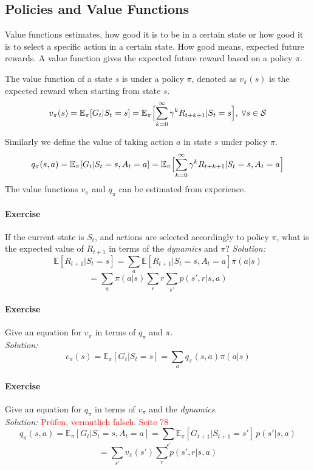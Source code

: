 \documentclass[10pt,a4paper]{article}
\begin{document}
\subsection{Policies and Value Functions}
Value functions estimates, how good it is to be in a certain state or how good it is to select a specific action in a certain state.
How good means, expected future rewards. A value function gives the expected future reward based on a policy $\pi$.

The value function of a state $s$ is under a policy $\pi$, denoted as $v_{\pi}(s)$ is the expected reward when starting from state $s$.
\[ v_{\pi}(s) = \mathbb{E}_{\pi}[G_t | S_t = s] = \mathbb{E}_{\pi} \Bigl [\sum_{k=0}^{\infty} \gamma^k R_{t+k+1} | S_t = s \Bigr ], \; \forall s \in \mathcal{S}\]

Similarly we define the value of taking action $a$ in state $s$ under policy $\pi$.
\[ q_{\pi}(s,a) = \mathbb{E}_{\pi}[ G_t | S_t=s, A_t=a] = \mathbb{E}_{\pi} \Bigl[\sum_{k=0}^{\infty} \gamma^k R_{t+k+1} | S_t = s, A_t=a \Bigr ] \]
The value functions $v_\pi$ and $q_\pi$ can be estimated from experience.

\paragraph{Exercise}
If the current state is $S_t$, and actions are selected accordingly to policy $\pi$, what is the expected value of $R_{t+1}$ in terms of the \textit{dynamics} and $\pi$?
\textit{Solution:}
\[ \mathbb{E}[R_{t+1} | S_t=s] = \sum_a \mathbb{E}[R_{t+1} | S_t=s, A_t = a] \pi(a | s) \]
\[ = \sum_a \pi(a | s) \sum_r r \sum_{s'} p(s',r | s, a)  \]
\paragraph{Exercise}
Give an equation for $v_\pi$ in terms of $q_\pi$ and $\pi$.\\
\textit{Solution:}
\[ v_\pi(s) = \mathbb{E}_\pi[G_t | S_t = s ] = \sum_a q_\pi(s,a) \pi(a | s) \]
\paragraph{Exercise}
Give an equation for $q_\pi$ in terms of $v_\pi$ and the \textit{dynamics}.\\
\textit{Solution:} \textcolor{red}{Prüfen, vermutlich falsch. Seite 78}
\[ q_\pi(s,a) = \mathbb{E}_\pi [G_t | S_t=s, A_t = a] = 
\sum_{s'} \mathbb{E}_\pi [G_{t+1} | S_{t+1}=s'] \, p(s' | s,a)\]
\[ = \sum_{s'} v_\pi(s') \sum_r p(s',r | s,a) \]
\end{document}
